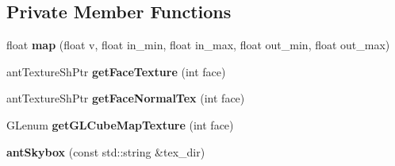 \subsection*{Private Member Functions}
\begin{DoxyCompactItemize}
\item 
\hypertarget{classant_skybox_a0ae646ac446c4e320b5846ae02253787}{float {\bfseries map} (float v, float in\+\_\+min, float in\+\_\+max, float out\+\_\+min, float out\+\_\+max)}\label{classant_skybox_a0ae646ac446c4e320b5846ae02253787}

\item 
\hypertarget{classant_skybox_a2d09085e742ab68b22dcdc81fe8381d2}{ant\+Texture\+Sh\+Ptr {\bfseries get\+Face\+Texture} (int face)}\label{classant_skybox_a2d09085e742ab68b22dcdc81fe8381d2}

\item 
\hypertarget{classant_skybox_ad84025f713178b52e9575e00ededc0e4}{ant\+Texture\+Sh\+Ptr {\bfseries get\+Face\+Normal\+Tex} (int face)}\label{classant_skybox_ad84025f713178b52e9575e00ededc0e4}

\item 
\hypertarget{classant_skybox_a50dee4261170555d8ff75db2d8cea65d}{G\+Lenum {\bfseries get\+G\+L\+Cube\+Map\+Texture} (int face)}\label{classant_skybox_a50dee4261170555d8ff75db2d8cea65d}

\item 
\hypertarget{classant_skybox_ae03fee97951343ba8d41601efb64b978}{{\bfseries ant\+Skybox} (const std\+::string \&tex\+\_\+dir)}\label{classant_skybox_ae03fee97951343ba8d41601efb64b978}

\end{DoxyCompactItemize}
